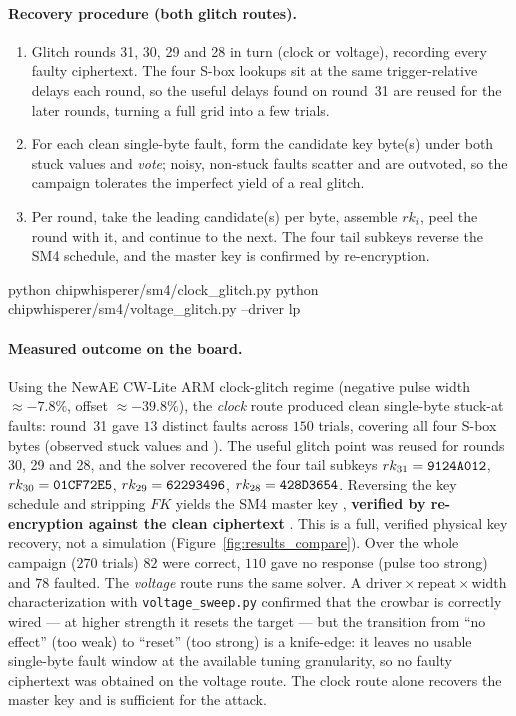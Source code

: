 \paragraph{Recovery procedure (both glitch routes).}
\begin{enumerate}
\item Glitch rounds 31, 30, 29 and 28 in turn (clock or voltage), recording every
faulty ciphertext. The four S-box lookups sit at the same trigger-relative delays
each round, so the useful delays found on round~31 are reused for the later
rounds, turning a full grid into a few trials.
\item For each clean single-byte fault, form the candidate key byte(s) under both
stuck values and \emph{vote}; noisy, non-stuck faults scatter and are outvoted, so
the campaign tolerates the imperfect yield of a real glitch.
\item Per round, take the leading candidate(s) per byte, assemble $rk_i$, peel the
round with it, and continue to the next. The four tail subkeys reverse the SM4
schedule, and the master key is confirmed by re-encryption.
\end{enumerate}

\begin{lightcode}
python chipwhisperer/sm4/clock_glitch.py
python chipwhisperer/sm4/voltage_glitch.py --driver lp
\end{lightcode}

\paragraph{Measured outcome on the board.}
Using the NewAE CW-Lite ARM clock-glitch regime (negative pulse width
$\approx-7.8\%$, offset $\approx-39.8\%$), the \emph{clock} route produced clean
single-byte stuck-at faults: round~31 gave $13$ distinct faults across $150$
trials, covering all four S-box bytes (observed stuck values  and
). The useful glitch point was reused for rounds 30, 29 and 28, and the
solver recovered the four tail subkeys
$rk_{31}=\texttt{9124A012}$, $rk_{30}=\texttt{01CF72E5}$,
$rk_{29}=\texttt{62293496}$, $rk_{28}=\texttt{428D3654}$. Reversing the key schedule
and stripping $FK$ yields the SM4 master key
, \textbf{verified by re-encryption against
the clean ciphertext} . This is a full,
verified physical key recovery, not a simulation (Figure~\ref{fig:results_compare}).
Over the whole campaign ($270$ trials) $82$ were correct, $110$ gave no response
(pulse too strong) and $78$ faulted. The \emph{voltage} route runs the same
solver. A driver\,$\times$\,repeat\,$\times$\,width characterization with
\texttt{voltage\_sweep.py} confirmed that the crowbar is correctly wired --- at
higher strength it resets the target --- but the transition from ``no effect''
(too weak) to ``reset'' (too strong) is a knife-edge: it leaves no usable
single-byte fault window at the available tuning granularity, so no faulty
ciphertext was obtained on the voltage route. The clock route alone recovers the
master key and is sufficient for the attack.

